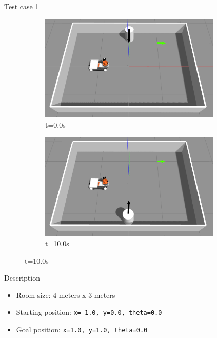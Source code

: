 \documentclass{beamer}
\begin{document}
\begin{frame}[t]{\huge{Test case 1}}
\begin{figure}[ht]
    \centering
    \begin{subfigure}[b]{0.50\linewidth}
        \centering
        \includegraphics[width=0.95\textwidth]{../report/images/test_case_1/exp1.png}
        \caption{t=0.0s}
    \end{subfigure}%
    \begin{subfigure}[b]{0.50\linewidth}
        \centering
        \includegraphics[width=0.95\textwidth]{../report/images/test_case_1/exp3.png}
        \caption{t=10.0s}
    \end{subfigure}%
\end{figure}
    \begin{block}{Description}
        \begin{itemize}
            \item Room size: 4 meters x 3 meters
            \item Starting position: \texttt{x=-1.0, y=0.0, theta=0.0} 
            \item Goal position: \texttt{x=1.0, y=1.0, theta=0.0}
        \end{itemize}
    \end{block}
\end{frame}
\end{document}
